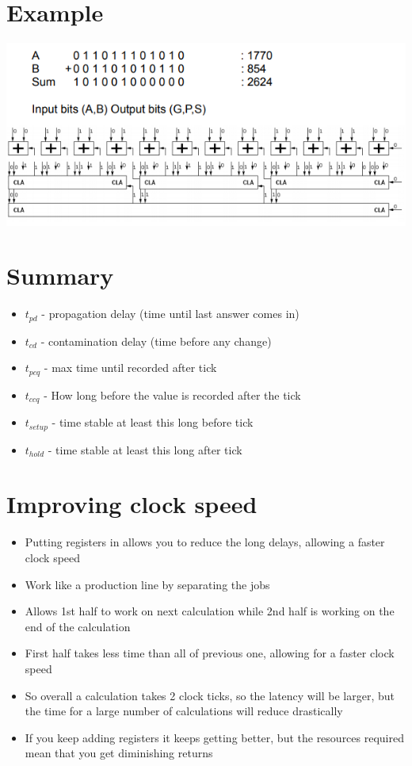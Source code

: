 \documentclass{article}[18pt]
\begin{document}
\section{Example}
\begin{center}
	\includegraphics[scale=0.7]{example}
\end{center}
\section{Summary}
\begin{itemize}
	
	\item $t_{pd}$ - propagation delay (time until last answer comes in)
	\item $t_{cd}$ - contamination delay (time before any change)
	\item $t_{pcq}$ - max time until recorded after tick
	\item $t_{ccq}$ - How long before the value is recorded after the tick
	\item $t_{setup}$ - time stable at least this long before tick 
	\item $t_{hold}$ - time stable at least this long after tick
\end{itemize}
\section{Improving clock speed}
\begin{itemize}
	\item Putting registers in allows you to reduce the long delays, allowing a faster clock speed
	\item Work like a production line by separating the jobs
	\item Allows 1st half to work on next calculation while 2nd half is working on the end of the calculation
	\item First half takes less time than all of previous one, allowing for a faster clock speed
	\item So overall a calculation takes 2 clock ticks, so the latency will be larger, but the time for a large number of calculations will reduce drastically
	\item If you keep adding registers it keeps getting better, but the resources required mean that you get diminishing returns
\end{itemize}
\end{document}
